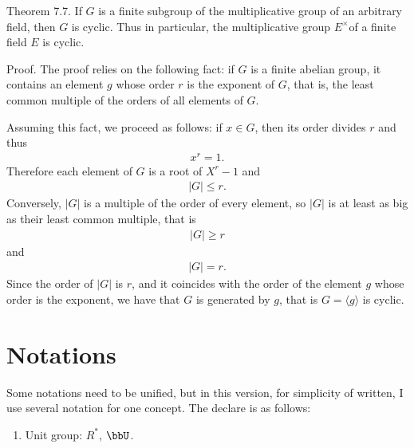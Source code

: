 \documentclass{article}
\begin{document}
Theorem 7.7. If $G$ is a finite subgroup of the multiplicative group of an arbitrary field, then $G$ is cyclic. Thus in particular, the multiplicative group $E^{\times}$of a finite field $E$ is cyclic.

Proof. The proof relies on the following fact: if $G$ is a finite abelian group, it contains an element $g$ whose order $r$ is the exponent of $G$, that is, the least common multiple of the orders of all elements of $G$.

Assuming this fact, we proceed as follows: if $x \in G$, then its order divides $r$ and thus
\begin{align*}
x^{r}=1 .
\end{align*}
Therefore each element of $G$ is a root of $X^{r}-1$ and
\begin{align*}
|G| \leq r .
\end{align*}
Conversely, $|G|$ is a multiple of the order of every element, so $|G|$ is at least as big as their least common multiple, that is
\begin{align*}
|G| \geq r
\end{align*}
and
\begin{align*}
|G|=r .
\end{align*}
Since the order of $|G|$ is $r$, and it coincides with the order of the element $g$ whose order is the exponent, we have that $G$ is generated by $g$, that is $G=\langle g\rangle$ is cyclic.

\section{Notations}
Some notations need to be unified, but in this version, for simplicity of written, I use several notation for one concept. The declare is as follows:

\begin{enumerate}
    \item Unit group: $R^*$, $\bbU$.
\end{enumerate}


\end{document}
